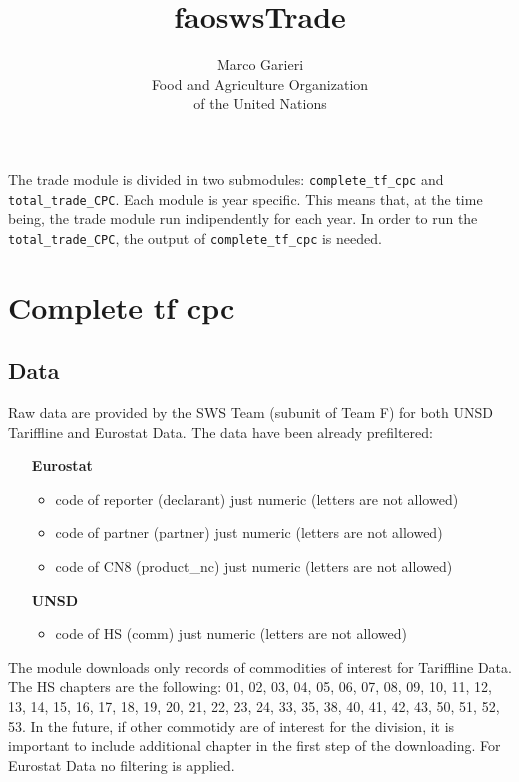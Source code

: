 \documentclass[nojss]{jss}\usepackage[]{graphicx}\usepackage[]{color}
\title{\bf faoswsTrade}
\author{Marco Garieri \\ Food and Agriculture Organization \\ of
  the United Nations}
\begin{document}
\newpage


The trade module is divided in two submodules: {\tt complete\_tf\_cpc} and {\tt total\_trade\_CPC}. Each module is year specific. This means that, at the time being, the trade module run indipendently for each year. In order to run the {\tt total\_trade\_CPC}, the output of {\tt complete\_tf\_cpc} is needed.

\section{Complete tf cpc}

\subsection{Data}
Raw data are provided by the SWS Team (subunit of Team F) for both UNSD Tariffline and Eurostat Data. The data have been already prefiltered:
\begin{itemize}
\item [\bf{Eurostat}]
\begin{itemize}
\item code of reporter (declarant) just numeric (letters are not allowed)
\item code of partner (partner) just numeric (letters are not allowed)
\item code of CN8 (product\_nc) just numeric (letters are not allowed)
\end{itemize}
\item [\bf{UNSD}]
\begin{itemize}
\item code of HS (comm) just numeric (letters are not allowed)
\end{itemize}
\end{itemize}
The module downloads only records of commodities of interest for Tariffline Data. The HS chapters are the following: 01, 02, 03, 04, 05, 06, 07, 08, 09, 10, 11, 12, 13, 14, 15, 16, 17, 18, 19, 20, 21, 22, 23, 24, 33, 35, 38, 40, 41, 42, 43, 50, 51, 52, 53. In the future, if other commotidy are of interest for the division, it is important to include additional chapter in the first step of the downloading. For Eurostat Data no filtering is applied.
\end{document}
